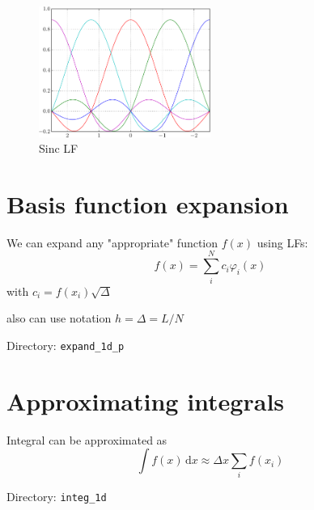 \begin{figure}[h]
{\centering
\includegraphics[width=0.5\textwidth]{../../tests/plot_1d/LF1d_sinc.pdf}
\par}
\caption{Sinc LF}\label{fig:LF1d_sinc_5}
\end{figure}


\section{Basis function expansion}

We can expand any "appropriate" function $f(x)$ using LFs:
\begin{equation}
f(x) = \sum_{i}^{N} c_{i} \varphi_{i}(x)
\end{equation}
with $c_{i} = f(x_{i}) \sqrt{\Delta}$

also can use notation $h = \Delta = L/N$

Directory: \texttt{expand_1d_p}





\section{Approximating integrals}

Integral can be approximated as
\begin{equation}
\int f(x)\,\mathrm{d}x \approx \Delta x \sum_{i} f(x_{i})
\end{equation}

Directory: \texttt{integ_1d}
